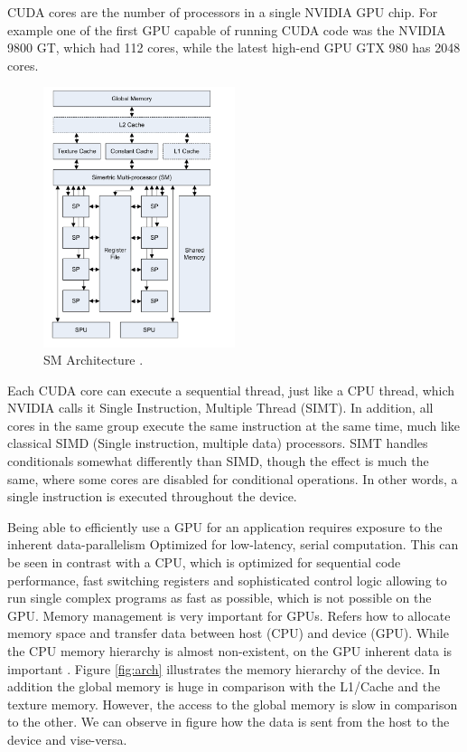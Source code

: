 CUDA cores are the number of processors in a single NVIDIA GPU chip. For example one of the first GPU capable of running CUDA code was the NVIDIA 9800 GT, which had 112 cores, while the latest high-end GPU GTX 980 has 2048 cores.

\begin{figure}[htbp]
	\centering
		\includegraphics[width=0.5\textwidth]{Figures/GPU_CPU.png}
		\smallskip
	\caption[Architecture of NVIDIA's SM]{SM Architecture \cite{cook}.}
	\label{fig:gpu_cpu}
\end{figure}


Each CUDA core can execute a sequential thread, just like a CPU thread, which NVIDIA calls it Single Instruction, Multiple Thread (SIMT). In addition, all cores in the same group execute the same instruction at the same time, much like classical SIMD (Single instruction, multiple data) processors. SIMT handles conditionals somewhat differently than SIMD, though the effect is much the same, where some cores are disabled for conditional operations. In other words, a single instruction is executed throughout the device.

Being able to efficiently use a GPU for an application requires exposure to the inherent data-parallelism Optimized for low-latency, serial computation. This can be seen in contrast with a CPU, which is optimized for sequential code performance, fast switching registers  and sophisticated control logic allowing to run single complex programs as fast as possible, which is not possible on the GPU. Memory management is very important for GPUs. Refers how to allocate memory space and transfer data between host (CPU) and device (GPU). While the CPU memory hierarchy is almost non-existent, on the GPU inherent data is important \cite{hwu}. Figure \ref{fig:arch} illustrates the memory hierarchy of the device. In addition the global memory is huge in comparison with the L1/Cache and the texture memory. However, the access to the global memory is slow in comparison to the other. We can observe in figure how the data is sent from the host to the device and vise-versa.

